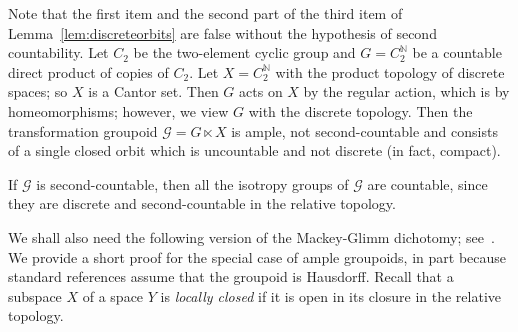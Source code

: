 \documentclass[11pt,reqno]{amsart}
\theoremstyle{plain}
\numberwithin{equation}{section}
\begin{document}
Note that the first item and the second part of the third item of Lemma~\ref{lem:discreteorbits} are false without the hypothesis of second countability.  Let $C_2$ be the two-element cyclic group and $G=C_2^{\mathbb N}$ be a countable direct product of copies of $C_2$.   Let $X=C_2^{\mathbb N}$ with the product topology of discrete spaces; so $X$ is a Cantor set.  Then $G$ acts on $X$ by the regular action, which is by homeomorphisms; however, we view $G$ with the discrete topology.  Then the transformation groupoid $\mathscr G = G\ltimes X$ is ample, not second-countable and consists of a single closed orbit which is uncountable and not discrete (in fact, compact).

If $\mathscr G$ is second-countable, then all the isotropy groups of $\mathscr G$  are countable, since they are discrete and second-countable in the relative topology.


We shall also need the following version of the Mackey-Glimm dichotomy; see~\cite{Ram90}.  %
We provide a short proof for the special case of ample groupoids, in part because standard references assume  that the groupoid is Hausdorff. Recall that a subspace $X$ of a space $Y$ is \emph{locally closed} if it is open in its closure in the relative topology.
\end{document}
